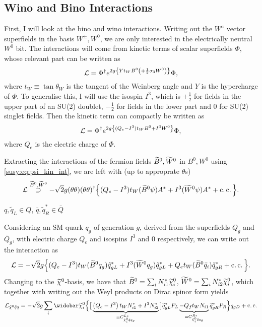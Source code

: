 \documentclass[../main.tex]{subfiles}
\begin{document}
\subsection{Wino and Bino Interactions}
First, I will look at the bino and wino interactions. Writing out the \(W^a\)
vector superfields in the basis \(W^\pm, W^0\), we are only interested in the
electrically neutral \(W^0\) bit. The interactions will come from kinetic terms
of scalar superfields \(\Phi\), whose relevant part can be written as
\begin{equation}
  \L = \Phi^\dagger \exp{2g\cclosed{Y t_W B^0 \pclosed{+ \frac{1}{2}\sigma_3 W^0}}} \Phi,
\end{equation}
where \(t_W \equiv \tan\theta_W\) is the tangent of the Weinberg angle and \(Y\) is the hypercharge of \(\Phi\).
To generalise this, I will use the isospin \(I^3\), which is \(+\frac{1}{2}\) for fields in the upper part of an SU(2) doublet, \(-\frac{1}{2}\) for fields in the lower part and 0 for SU(2) singlet fields.
Then the kinetic term can compactly be written as
\begin{equation}
  \L = \Phi^\dagger \exp{2g\cclosed{(Q_e - I^3) t_W B^0 + I^3 W^0}} \Phi,
\end{equation}
where \(Q_e\) is the electric charge of \(\Phi\).
\medskip

Extracting the interactions of the fermion fields \(\bino, \wino\) in \(B^0,
W^0\) using \cref{susy:eq:psi_kin_int}, we are left with (up to approprate
\(\theta\)s)
\begin{equation}
  \L \stackrel{\bino, \wino}{\supset} -\sqrt{2}g (\theta\theta)(\theta\theta)^\dagger \Big\{ (Q_e - I^3)t_W (\bino \psi) A^\ast + I^3 (\wino \psi) A^\ast + \cc \Big\}.
\end{equation}

\begin{temporary}
  \(q, \tilde{q}_L \in Q\), \(\bar{q}, \tilde{q}_R^\ast \in \bar{Q}\)
\end{temporary}

Considering an SM quark \(q_g\) of generation \(g\), derived from the superfields \(Q_g\) and \(\bar{Q}_g\), with
electric charge \(Q_e\) and isospins \(I^3\) and 0 respectively, we can write out the interaction as
\begin{equation}
  \L = -\sqrt{2}g \Big\{ (Q_e - I^3)t_W (\bino q_g) \tilde{q}_{gL}^\ast + I^3 (\wino q_g) \tilde{q}_{gL}^\ast + Q_e t_W (\bino \bar{q}_i) \tilde{q}_{gR}^\ast + \cc \Big\}.
\end{equation}
Changing to the \(\nino\)-basis, we have that \(\bino = \sum_i N_{i1}^\ast \nino[i]\), \(\wino = \sum_i N_{i2}^\ast \nino[i]\), which together with writing out the Weyl products on Dirac spinor form yields
\begin{equation}
  \label{susy:eq:nino_sf_f_int}
  \L_{\tilde{\chi}^0 \tilde{q}q} = -\sqrt{2} g \sum_{i} \barnino[i] \Big\{ \big[ \underbrace{\pclosed{Q_e - I^3}t_W N_{i1}^\ast  + I^3 N_{i2}^\ast}_{\equiv C_{\tilde{\chi}^0_i \tilde{q} q_g}^{L\ast}} \big] \wtilde{q}_{gL}^\ast P_L \underbrace{- Q_f t_W N_{i1}}_{\equiv C_{\tilde{\chi}^0_i \tilde{q} q_g}^{R\ast}} \wtilde{q}_{gR}^\ast P_R \Big\} q_{gD} + \cc
\end{equation}
\end{document}
